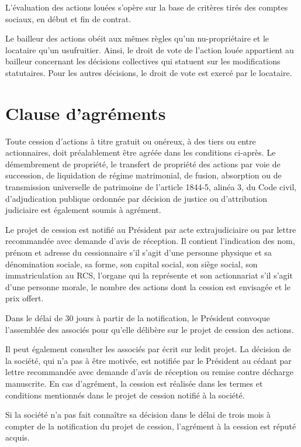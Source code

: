 \documentclass[a4paper,12pt]{report}
\begin{document}
L'évaluation des actions louées s'opère sur la base de critères tirés des comptes sociaux, en début et fin de contrat.

Le bailleur des actions obéit aux mêmes règles qu'un nu-propriétaire et le locataire qu'un usufruitier. 
Ainsi, le droit de vote de l'action louée appartient au bailleur concernant les décisions collectives qui statuent sur les modifications statutaires. 
Pour les autres décisions, le droit de vote est exercé par le locataire.

\section{Clause d'agréments}
Toute cession d'actions à titre gratuit ou onéreux, à des tiers ou entre actionnaires, doit préalablement être agréée dans les conditions ci-après.
Le démembrement de propriété, le transfert de propriété des actions par voie de succession, de liquidation de régime matrimonial, de fusion, 
absorption ou de transmission universelle de patrimoine de l'article 1844-5, alinéa 3, du Code civil, d'adjudication publique ordonnée par décision de justice ou 
d'attribution judiciaire est également soumis à agrément.  

Le projet de cession est notifié au Président par acte extrajudiciaire ou par lettre recommandée avec demande d'avis de réception. 
Il contient l'indication des nom, prénom et adresse du cessionnaire s'il s'agit d'une personne physique et sa dénomination sociale, 
sa forme, son capital social, son siège social, son immatriculation au RCS, l'organe qui la représente et son actionnariat s'il s'agit d'une personne morale, 
le nombre des actions dont la cession est envisagée et le prix offert.  

Dans le délai de 30 jours à partir de la notification, 
le Président convoque l'assemblée des associés pour qu'elle délibère sur le projet de cession des actions.  

Il peut également consulter les associés par écrit sur ledit projet. La décision de la société, qui n'a pas à être motivée, 
est notifiée par le Président au cédant par lettre recommandée avec demande d'avis de réception ou remise contre décharge manuscrite. 
En cas d'agrément, la cession est réalisée dans les termes et conditions mentionnés dans le projet de cession notifié à la société.  

Si la société n'a pas fait connaître sa décision dans le délai de trois mois à compter de la notification du projet de cession, 
l'agrément à la cession est réputé acquis.
\end{document}
